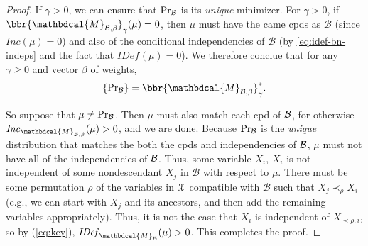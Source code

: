 \documentclass{article}
\theoremstyle{plain}
\theoremstyle{definition}
\theoremstyle{remark}
\let\H\relax
\DeclareMathOperator{\H}{\mathrm{H}} %
\newcommand{\dg}[1]{\mathbdcal{#1}}
\newcommand{\IDef}[1]{\mathit{IDef}_{#1}}
\newcommand\Inc{\mathit{Inc}}
\newcommand{\PDGof}[1]{{\dg M}_{#1}}
\numberwithin{equation}{section}
\begin{document}
\begin{proof}
{If $\gamma > 0$, we can ensure that $\Pr_{\cal B}$ is its \emph{unique} minimizer. For $\gamma > 0$, if $\bbr{\PDGof{\mathcal B, \beta}}_\gamma(\mu) = 0$, then $\mu$ must have the came cpds as $\mathcal B$ (since $\Inc(\mu) = 0$) and also of the conditional independencies of $\mathcal B$ (by \eqref{eq:idef-bn-indeps} and the fact that $\IDef{}(\mu) = 0$).
We therefore conclue that for any $\gamma\geq0$ and vector $\beta$ of weights, 
\[ \{ \Pr\nolimits_{\cal B} \} = \bbr{\PDGof{\mathcal B, \beta}}_\gamma^* .\]

	
}
So suppose that $\mu \ne \Pr_{\cal B}$. 
Then $\mu$ must also match each cpd of $\cal B$,
for otherwise $\Inc_{\PDGof{\mathcal B,
\beta}}(\mu) > 0$, and we are done.  
Because $\Pr_{\cal B}$ is the \emph{unique} distribution that matches the 
both the cpds and independencies of $\cal B$, $\mu$ must not have all of the 
independencies of $\cal B$. 
Thus,
some variable $X_i$, $X_i$ is not independent of some nondescendant $X_j$ in
$\mathcal B$ with respect to $\mu$.  There must be some permutation
$\rho$ of the variables in $\mathcal X$ compatible with ${\mathcal B}$
such that $X_j \prec_{\rho} X_i$ (e.g., we can start with $X_j$ and
its ancestors, and then add the remaining variables appropriately).
Thus, it is not the case that $X_i$ is independent of $X_{\prec \rho,
  i}$, so by (\ref{eq:key}), $\IDef{\PDGof{\mathcal B}}(\mu) > 0$.
This completes the proof.
\end{proof}
\end{document}
